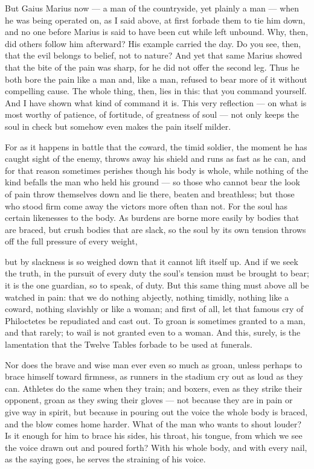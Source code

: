 But Gaius Marius now — a man of the countryside, yet plainly a man — when he was being operated on, as I said above, at first forbade them to tie him down, and no one before Marius is said to have been cut while left unbound. Why, then, did others follow him afterward? His example carried the day. Do you see, then, that the evil belongs to belief, not to nature? And yet that same Marius showed that the bite of the pain was sharp, for he did not offer the second leg. Thus he both bore the pain like a man and, like a man, refused to bear more of it without compelling cause. The whole thing, then, lies in this: that you command yourself. And I have shown what kind of command it is. This very reflection — on what is most worthy of patience, of fortitude, of greatness of soul — not only keeps the soul in check but somehow even makes the pain itself milder.

 For as it happens in battle that the coward, the timid soldier, the moment he has caught sight of the enemy, throws away his shield and runs as fast as he can, and for that reason sometimes perishes though his body is whole, while nothing of the kind befalls the man who held his ground — so those who cannot bear the look of pain throw themselves down and lie there, beaten and breathless; but those who stood firm come away the victors more often than not. For the soul has certain likenesses to the body. As burdens are borne more easily by bodies that are braced, but crush bodies that are slack, so the soul by its own tension throws off the full pressure of every weight,

 but by slackness is so weighed down that it cannot lift itself up. And if we seek the truth, in the pursuit of every duty the soul's tension must be brought to bear; it is the one guardian, so to speak, of duty. But this same thing must above all be watched in pain: that we do nothing abjectly, nothing timidly, nothing like a coward, nothing slavishly or like a woman; and first of all, let that famous cry of Philoctetes be repudiated and cast out. To groan is sometimes granted to a man, and that rarely; to wail is not granted even to a woman. And this, surely, is the lamentation that the Twelve Tables forbade to be used at funerals.

 Nor does the brave and wise man ever even so much as groan, unless perhaps to brace himself toward firmness, as runners in the stadium cry out as loud as they can. Athletes do the same when they train; and boxers, even as they strike their opponent, groan as they swing their gloves — not because they are in pain or give way in spirit, but because in pouring out the voice the whole body is braced, and the blow comes home harder. What of the man who wants to shout louder? Is it enough for him to brace his sides, his throat, his tongue, from which we see the voice drawn out and poured forth? With his whole body, and with every nail, as the saying goes, he serves the straining of his voice.

